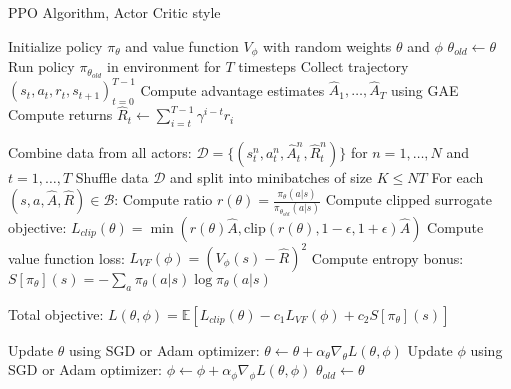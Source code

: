 \begin{algorithm}[H]
\caption{PPO Algorithm, Actor Critic style}
\begin{algorithmic}[1]
\State Initialize policy $\pi_{\theta}$ and value function $V_{\phi}$ with random weights $\theta$ and $\phi$
\State $\theta_{old} \leftarrow \theta$
\Repeat
        \State Run policy $\pi_{\theta_{old}}$ in environment for $T$ timesteps
        \State Collect trajectory $(s_t, a_t, r_t, s_{t+1})_{t=0}^{T-1}$
        \State Compute advantage estimates $\hat{A}_1, \ldots, \hat{A}_T$ using GAE
        \State Compute returns $\hat{R}_t \leftarrow \sum_{i=t}^{T-1} \gamma^{i-t} r_i$
    \EndFor
    
    \State Combine data from all actors: $\mathcal{D} = \{(s_t^n, a_t^n, \hat{A}_t^n, \hat{R}_t^n)\}$ for $n=1,\ldots,N$ and $t=1,\ldots,T$
        \State Shuffle data $\mathcal{D}$ and split into minibatches of size $K \leq NT$
            \State For each $(s, a, \hat{A}, \hat{R}) \in \mathcal{B}$:
            \State \quad Compute ratio $r(\theta) = \frac{\pi_{\theta}(a|s)}{\pi_{\theta_{old}}(a|s)}$
            \State \quad Compute clipped surrogate objective:
            \State \quad $L_{clip}(\theta) = \min(r(\theta)\hat{A}, \text{clip}(r(\theta), 1-\epsilon, 1+\epsilon)\hat{A})$
            \State \quad Compute value function loss:
            \State \quad $L_{VF}(\phi) = (V_{\phi}(s) - \hat{R})^2$
            \State \quad Compute entropy bonus:
            \State \quad $S[\pi_{\theta}](s) = -\sum_a \pi_{\theta}(a|s) \log \pi_{\theta}(a|s)$
            
            \State \quad Total objective: $L(\theta, \phi) = \mathbb{E}[L_{clip}(\theta) - c_1 L_{VF}(\phi) + c_2 S[\pi_{\theta}](s)]$
            
            \State \quad Update $\theta$ using SGD or Adam optimizer: $\theta \leftarrow \theta + \alpha_{\theta} \nabla_{\theta} L(\theta, \phi)$
            \State \quad Update $\phi$ using SGD or Adam optimizer: $\phi \leftarrow \phi + \alpha_{\phi} \nabla_{\phi} L(\theta, \phi)$
        \EndFor
    \EndFor
    \State $\theta_{old} \leftarrow \theta$
\end{algorithmic}
\end{algorithm}

